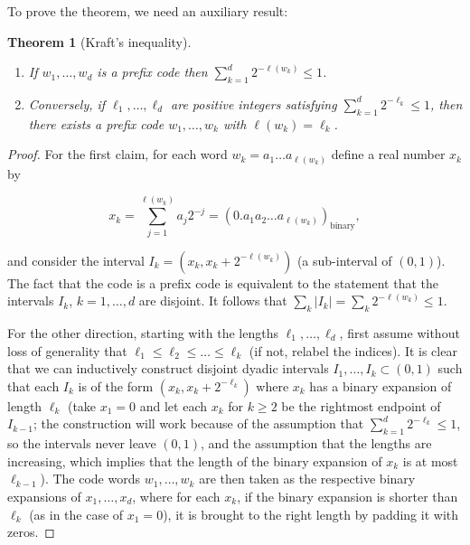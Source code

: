 \documentclass[11pt]{report}
\theoremstyle{plain}
\newtheorem{thm}{Theorem}[chapter]
\theoremstyle{definition}
\begin{document}
\noindent To prove the theorem, we need an auxiliary result:

\begin{thm}[Kraft's inequality]

\begin{enumerate}[label=\arabic*.]
\item If $w_1,\ldots,w_d$ is a prefix code then
$\sum_{k=1}^d 2^{-\ell(w_k)} \le 1$.

\item Conversely, if $\ell_1,\ldots,\ell_d$ are positive
integers satisfying $\sum_{k=1}^d 2^{-\ell_k} \le 1$,
then there exists a prefix code $w_1,\ldots,w_k$ with
$\ell(w_k)=\ell_k$.
\end{enumerate}

\end{thm}

\begin{proof}
For the first claim, for each word
$w_k=a_1\ldots a_{\ell(w_k)}$ define a real number
$x_k$ by

\[
x_k = \sum_{j=1}^{\ell(w_k)} a_j 2^{-j} = (0.a_1a_2\ldots a_{\ell(w_k)})_{\textrm{binary}},
\]

\noindent and consider the interval
$I_k = (x_k,x_k+2^{-\ell(w_k)})$ (a sub-interval of
$(0,1)$). The fact that the code is a prefix code is
equivalent to the statement that the intervals $I_k$,
$k=1,\ldots,d$ are disjoint. It follows that
$\sum_k |I_k| = \sum_k 2^{-\ell(w_k)} \le 1$.

For the other direction, starting with the lengths
$\ell_1,\ldots,\ell_d$, first assume without loss of
generality that
$\ell_1\le \ell_2\le \ldots \le \ell_k$ (if not,
relabel the indices). It is clear that we can
inductively construct disjoint dyadic intervals
$I_1,\ldots,I_k \subset (0,1)$ such that each $I_k$
is of the form $(x_k,x_k+2^{-\ell_k})$ where $x_k$
has a binary expansion of length $\ell_k$ (take
$x_1=0$ and let each $x_k$ for $k\ge 2$ be the
rightmost endpoint of $I_{k-1}$; the construction
will work because of the assumption that
$\sum_{k=1}^d 2^{-\ell_k} \le 1$, so the intervals
never leave $(0,1)$, and the assumption that the
lengths are increasing, which implies that the length
of the binary expansion of $x_k$ is at most
$\ell_{k-1}$). The code words $w_1,\ldots,w_k$ are
then taken as the respective binary expansions of
$x_1,\ldots,x_d$, where for each $x_k$, if the binary
expansion is shorter than $\ell_k$ (as in the case of
$x_1=0$), it is brought to the right length by
padding it with zeros.
\end{proof}
\end{document}
